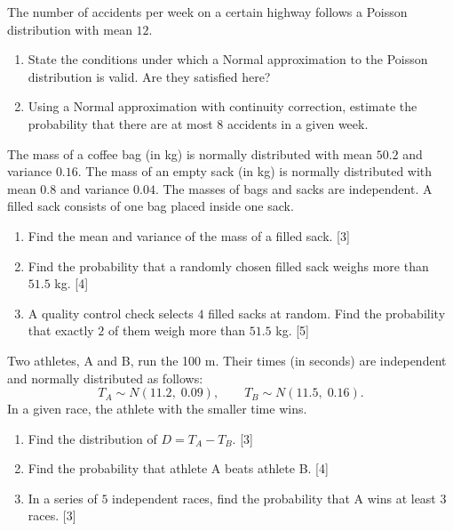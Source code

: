 \documentclass[11pt]{article}
\newcounter{popsec}
\newcounter{popsub}
\newcommand{\courssub}[1]{%
  \stepcounter{popsub}%
  \par\vspace{9pt}\noindent{\popxbold\fontsize{11.5}{13}\selectfont\color{popink}{\color{poporange}\thepopsec.\thepopsub}\hspace{6pt}#1}\par\nopagebreak\vspace{4pt}
}
\begin{document}
\begin{exercice}
The number of accidents per week on a certain highway follows a Poisson distribution with mean $12$.
\begin{enumerate}
\item State the conditions under which a Normal approximation to the Poisson distribution is valid. Are they satisfied here?
\item Using a Normal approximation with continuity correction, estimate the probability that there are at most $8$ accidents in a given week.
\end{enumerate}
\end{exercice}

\courssub{I prepare for the GCE}

\begin{exercice}
The mass of a coffee bag (in kg) is normally distributed with mean $50.2$ and variance $0.16$. The mass of an empty sack (in kg) is normally distributed with mean $0.8$ and variance $0.04$. The masses of bags and sacks are independent. A filled sack consists of one bag placed inside one sack.
\begin{enumerate}
\item Find the mean and variance of the mass of a filled sack. [3]
\item Find the probability that a randomly chosen filled sack weighs more than $51.5$ kg. [4]
\item A quality control check selects $4$ filled sacks at random. Find the probability that exactly $2$ of them weigh more than $51.5$ kg. [5]
\end{enumerate}
\end{exercice}

\begin{exercice}
Two athletes, A and B, run the 100 m. Their times (in seconds) are independent and normally distributed as follows:
\[
T_A \sim N(11.2,\; 0.09), \qquad T_B \sim N(11.5,\; 0.16).
\]
In a given race, the athlete with the smaller time wins.
\begin{enumerate}
\item Find the distribution of $D = T_A - T_B$. [3]
\item Find the probability that athlete A beats athlete B. [4]
\item In a series of $5$ independent races, find the probability that A wins at least $3$ races. [3]
\end{enumerate}
\end{exercice}
\end{document}
